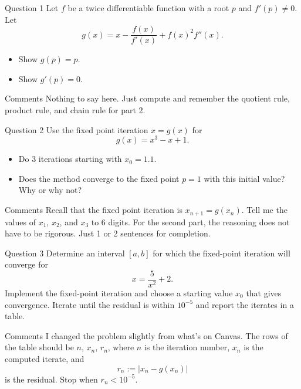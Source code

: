 \documentclass{beamer}
\begin{document}
\begin{frame}{Question 1}
  Let $f$ be a twice differentiable function with a root $p$ and $f'(p) \neq 0$. Let
  \begin{equation*}
    g(x) = x - \frac{f(x)}{f'(x)} + f(x)^2f''(x).
  \end{equation*}
  \begin{itemize}
    \item[(1)] Show $g(p) = p$.
    \item[(2)] Show $g'(p) = 0$.
  \end{itemize}
  \vfill
  \begin{block}{Comments}
    Nothing to say here. Just compute and remember the quotient rule, product rule, and chain rule for part 2.
  \end{block}
\end{frame}

\begin{frame}{Question 2}
  Use the fixed point iteration $x = g(x)$ for
  \begin{equation*}
    g(x) = x^3 - x + 1.
  \end{equation*}
  \vfill
  \begin{itemize}
    \item[(1)] Do 3 iterations starting with $x_0 = 1.1$.
      \vfill
    \item[(2)] Does the method converge to the fixed point $p = 1$ with this initial value? Why or why not?
\end{itemize}
  \vfill
  \begin{block}{Comments}
    Recall that the fixed point iteration is $x_{n+1} = g(x_n)$.
    Tell me the values of $x_1$, $x_2$, and $x_3$ to 6 digits.
    For the second part, the reasoning does not have to be rigorous.
    Just 1 or 2 sentences for completion.
  \end{block}
\end{frame}

\begin{frame}{Question 3}
  Determine an interval $[a,b]$ for which the fixed-point iteration will converge for
  \begin{equation*}
    x = \frac{5}{x^2} + 2.
  \end{equation*}
  Implement the fixed-point iteration and choose a starting value $x_0$ that gives convergence.
  Iterate until the residual is within $10^{-5}$ and report the iterates in a table.
  \vfill
  \begin{block}{Comments}
    I changed the problem slightly from what's on Canvas.
    The rows of the table should be $n$, $x_n$, $r_n$, where $n$ is the iteration number, $x_n$ is the computed iterate, and
    \begin{equation*}
      r_n := |x_n - g(x_n)|
    \end{equation*}
    is the residual.
    Stop when $r_n < 10^{-5}$.
  \end{block}
\end{frame}
\end{document}
